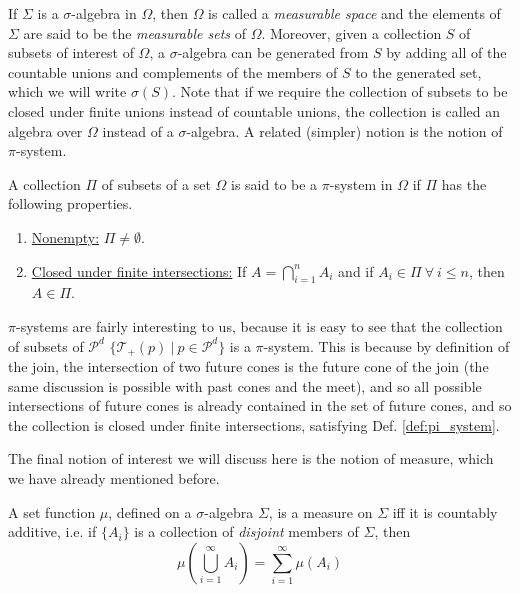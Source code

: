 If $\Sigma$ is a $\sigma$-algebra in $\Omega$, then $\Omega$ is called a \textit{measurable space} and the elements of $\Sigma$ are said to be the \textit{measurable sets} of $\Omega$. Moreover, given a collection $S$ of subsets of interest of $\Omega$, a $\sigma$-algebra can be generated from $S$ by adding all of the countable unions and complements of the members of $S$ to the generated set, which we will write $\sigma(S)$. Note that if we require the collection of subsets to be closed under finite unions instead of countable unions, the collection is called an algebra over $\Omega$ instead of a $\sigma$-algebra. A related (simpler) notion is the notion of $\pi$-system.

\begin{appendix_definition}[$\pi$-system] \label{def:pi_system}
    A collection $\Pi$ of subsets of a set $\Omega$ is said to be a $\pi$-system in $\Omega$ if $\Pi$ has the following properties.
    \begin{enumerate}
        \item \underline{Nonempty:} $\Pi \neq \emptyset$.
        \item \underline{Closed under finite intersections:} If $A = \bigcap\limits_{i = 1}^n A_i$ and if $A_i \in \Pi \: \forall \: i \leq n$, then $A \in \Pi$.
    \end{enumerate}
\end{appendix_definition}

\begin{appendix_remark} 
    $\pi$-systems are fairly interesting to us, because it is easy to see that the collection of subsets of $\mathcal{P}^d$ $\{\mathcal{T}_+(p) \: | \: p \in \mathcal{P}^d\}$  is a $\pi$-system. This is because by definition of the join, the intersection of two future cones is the future cone of the join (the same discussion is possible with past cones and the meet), and so all possible intersections of future cones is already contained in the set of future cones, and so the collection is closed under finite intersections, satisfying Def. \ref{def:pi_system}.
\end{appendix_remark}

The final notion of interest we will discuss here is the notion of measure, which we have already mentioned before.

\begin{appendix_definition}[Measure]
    A set function $\mu$, defined on a $\sigma$-algebra $\Sigma$, is a measure on $\Sigma$ iff it is countably additive, i.e. if $\{A_i\}$ is a collection of \textit{disjoint} members of $\Sigma$, then
    \begin{equation}
        \mu\left(\bigcup\limits_{i = 1}^\infty A_i\right) = \sum_{i = 1}^{\infty} \mu(A_i)
    \end{equation}
\end{appendix_definition}

